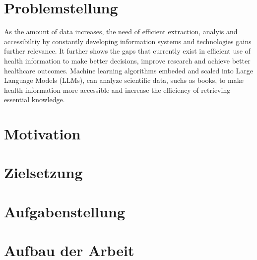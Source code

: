 \section{Problemstellung}
As the amount of data increases, the need of efficient extraction, analyis and accessibiltiy by constantly developing information systems and technologies gains further relevance. It further shows the gaps that currently exist in efficient use of health information to make better decisions, improve research and achieve better healthcare outcomes. Machine learning algorithms embeded and scaled into Large Language Models (LLMs), can analyze scientific data, suchs as books, to make health information more accessible and increase the efficiency of retrieving essential knowledge.

\section{Motivation}


\section{Zielsetzung}\label{sec:zielsetzung}


\section{Aufgabenstellung}



\section{Aufbau der Arbeit}
